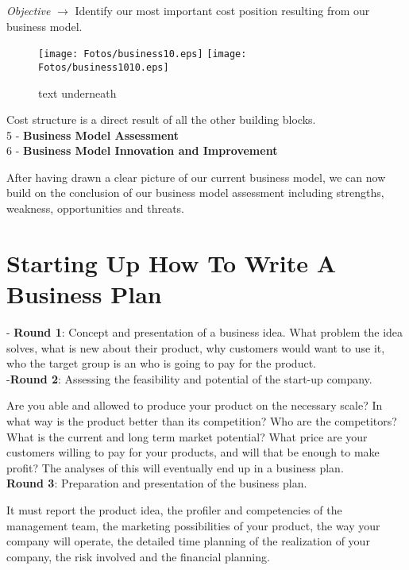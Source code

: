 \documentclass[11pt,a4paper]{article}
\begin{document}
\emph{Objective} $\to$ Identify our most important cost position resulting from our business model.\\
\begin{figure}[!H]
\begin{center}
\texttt{[image: Fotos/business10.eps]}
\texttt{[image: Fotos/business1010.eps]}
\end{center}
\caption{text underneath}
\end{figure}

Cost structure is a direct result of all the other building blocks.\\

5 - \textbf{Business Model Assessment}\\

6 - \textbf{Business Model Innovation and Improvement}

After having drawn a clear picture of our current business model, we can now build on the conclusion of our business model assessment including strengths, weakness, opportunities and threats.

\section{Starting Up How To Write A Business Plan}
- \textbf{Round 1}: Concept and presentation of a business idea. What problem the idea solves, what is new about their product, why customers would want to use it, who the target group is an who is going to pay for the product.\\

-\textbf{Round 2}: Assessing the feasibility and potential of the start-up company.

Are you able and allowed to produce your product on the necessary scale? In what way is the product better than its competition? Who are the competitors? What is the current and long term market potential? What price are your customers willing to pay for your products, and will that be enough to make profit? The analyses of this will eventually end up in a business plan.\\

\textbf{Round 3}: Preparation and presentation of the business plan.

It must report the product idea, the profiler and competencies of the management team, the marketing possibilities of your product, the way your company will operate, the detailed time planning of the realization of your company, the risk involved and the financial planning.\\
\end{document}
